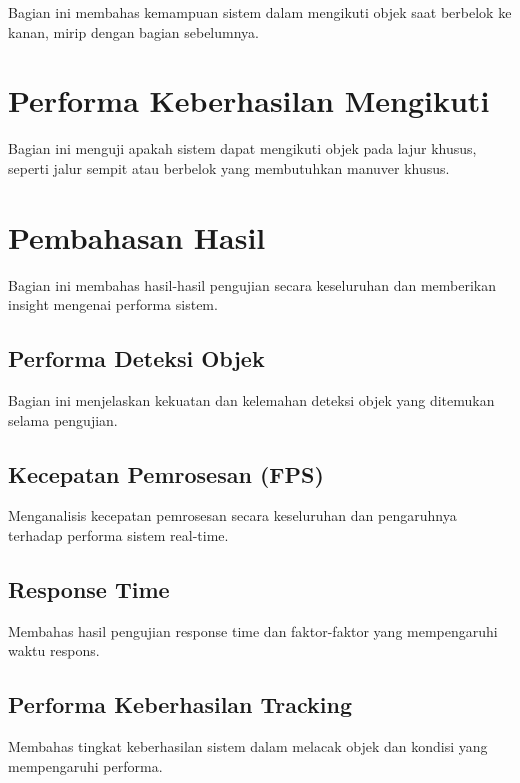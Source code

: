 Bagian ini membahas kemampuan sistem dalam mengikuti objek saat berbelok ke kanan, mirip dengan bagian sebelumnya.

\section{Performa Keberhasilan Mengikuti}
\label{sec:performamengikuti}

Bagian ini menguji apakah sistem dapat mengikuti objek pada lajur khusus, seperti jalur sempit atau berbelok yang membutuhkan manuver khusus.

\section{Pembahasan Hasil}
\label{sec:pembahasanhasil}

Bagian ini membahas hasil-hasil pengujian secara keseluruhan dan memberikan insight mengenai performa sistem.

\subsection{Performa Deteksi Objek}
\label{sec:performadeteksiobjek}

Bagian ini menjelaskan kekuatan dan kelemahan deteksi objek yang ditemukan selama pengujian.

\subsection{Kecepatan Pemrosesan (FPS)}
\label{sec:kecepatanpemrosesan}

Menganalisis kecepatan pemrosesan secara keseluruhan dan pengaruhnya terhadap performa sistem real-time.

\subsection{Response Time}
\label{sec:responsetime}

Membahas hasil pengujian response time dan faktor-faktor yang mempengaruhi waktu respons.

\subsection{Performa Keberhasilan Tracking}
\label{sec:performatracking}

Membahas tingkat keberhasilan sistem dalam melacak objek dan kondisi yang mempengaruhi performa.

